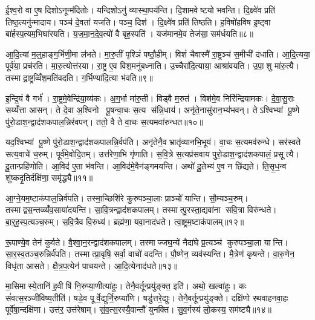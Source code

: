 ई॒श्व॒रो वा ए॒ष दिशोऽनून्म॑दितोः। यन्दिशोऽनु॑ व्यास्था॒पय॑न्ति। दि॒शामवेष्टयो भवन्ति। दि॒क्ष्वे॑व प्रति॑ तिष्ठ॒त्यनु॑न्मादाय। पञ्च॑ दे॒वता॑ यजति। पञ्च॒ दिश॑। दि॒क्ष्वे॑व प्रति॑ तिष्ठति। ह॒विषो॑हविष इ॒ष्ट्वा बा॑र्\mbox{}हस्प॒त्यम॒भिघा॑रयति। य॒ज॒मा॒न॒दे॒व॒त्यो॑ वै बृह॒स्पति॑। यज॑मानमे॒व तेज॑सा॒ सम॑र्धयति॥८॥

आ॒दि॒त्यां म॒ल्॒हाङ्ग॒र्भिणी॒मा ल॑भते। मा॒रु॒तीं पृश्ञिं॑ पष्ठौ॒हीम्। विशं॑ चैवास्मै॑ रा॒ष्ट्रञ्च॑ स॒मीची॑ दधाति। आ॒दि॒त्यया॒ पूर्व॑या॒ प्रच॑रति। मा॒रु॒त्योत्त॑रया। रा॒ष्ट्र ए॒व विश॒मनु॑बध्नाति। उ॒च्चैरा॑दि॒त्याया॒ आश्रा॑वयति। उ॒पा॒शु मा॑रु॒त्यै। तस्माद्रा॒ष्ट्रव्विँश॒मति॑वदति। ग॒र्भिण्या॑दि॒त्या भ॑वति॥९॥

इ॒न्द्रि॒यं वै गर्भ॑। रा॒ष्ट्रमे॒वेन्द्रि॑या॒व्य॑कः। अ॒ग॒र्भा मा॑रु॒ती। विड्वै म॒रुत॑। विश॑मे॒व निरि॑न्द्रियामकः। दे॒वा॒सु॒राः सय्यँ॑त्ता आसन्। ते दे॒वा अ॒श्विनो पू॒षन्वा॒चः स॒त्य स॑न्नि॒धाय॑। अनृ॑ते॒नासु॑रान॒भ्य॑भवन्। तेऽश्विभ्यां पू॒ष्णे पु॑रो॒डाश॒न्द्वाद॑शकपाल॒न्निर॑वपन्। ततो॒ वै ते वा॒चः स॒त्यमवा॑रुन्धत॥१०॥

यद॒श्विभ्यां पू॒ष्णे पु॑रो॒डाश॒न्द्वाद॑शकपालन्नि॒र्वप॑ति। अनृ॑तेनै॒व भ्रातृ॑व्यानभि॒भूय॑। वा॒चः स॒त्यमव॑रुन्धे। सर॑स्वते सत्य॒वाचे॑ च॒रुम्। पूर्व॑मे॒वोदि॒तम्। उत्त॑रेणा॒भि गृ॑णाति। स॒वि॒त्रे स॒त्यप्र॑सवाय पुरो॒डाश॒न्द्वाद॑शकपालं॒ प्रसूत्यै। दू॒तान्प्रहि॑णोति। आ॒विद॑ ए॒ता भ॑वन्ति। आ॒विद॑मे॒वैन॑ङ्गमयन्ति। अथो॑ दू॒तेभ्य॑ ए॒व न छि॑द्यते। ति॒सृ॒ध॒न्व शु॑ष्कदृ॒तिर्दक्षि॑णा॒ समृ॑द्ध्यै॥११॥\anuvakamend[अ॒र्ध॒य॒ति॒ भ॒व॒त्य॒रु॒न्ध॒त॒ ग॒म॒य॒न्ति॒ द्वे च॑]

आ॒ग्ने॒यम॒ष्टाक॑पाल॒न्निर्व॑पति। तस्मा॒च्छिशि॑रे कुरुपञ्चा॒लाः प्राञ्चो॑ यान्ति। सौ॒म्यञ्च॒रुम्। तस्माद्वस॒न्तव्व्यँ॑व॒साया॑दयन्ति। सा॒वि॒त्रन्द्वाद॑शकपालम्। तस्मात्पु॒रस्ता॒द्यवा॑ना सवि॒त्रा विरु॑न्धते। बा॒र्॒ह॒स्प॒त्यञ्च॒रुम्। स॒वि॒त्रैव वि॒रुध्य॑। ब्रह्म॑णा॒ यवा॒नाद॑धते। त्वा॒ष्ट्रम॒ष्टाक॑पालम्॥१२॥

रू॒पाण्ये॒व तेन॑ कुर्वते। वै॒श्वा॒न॒रन्द्वाद॑शकपालम्। तस्माज्जघ॒न्ये॑ नैदा॑घे प्र॒त्यञ्च॑ कुरुपञ्चा॒ला यान्ति। सा॒र॒स्व॒तञ्च॒रुन्निर्व॑पति। तस्मात्प्रा॒वृषि॒ सर्वा॒ वाचो॑ वदन्ति। पौ॒ष्णेन॒ व्यव॑स्यन्ति। मै॒त्रेण॑ कृषन्ते। वा॒रु॒णेन॒ विधृ॑ता आसते। क्षै॒त्र॒प॒त्येन॑ पाचयन्ते। आ॒दि॒त्येनाद॑धते॥१३॥

मा॒सिमास्ये॒तानि॑ ह॒वीषि॑ नि॒रुप्या॒णीत्या॑हुः। तेनै॒वर्तून्प्रयु॑ङ्क्त॒ इति॑। अथो॒ खल्वा॑हुः। कः सं॑वत्स॒रञ्जी॑विष्य॒तीति॑। षडे॒व पूर्वे॒द्युर्नि॒रुप्या॑णि। षडु॑त्तरे॒द्युः। तेनै॒वर्तून्प्रयु॑ङ्क्ते। दक्षि॑णो रथवाहनवा॒हः पूर्वे॑षा॒न्दक्षि॑णा। उत्त॑र॒ उत्त॑रेषाम्। सं॒व॒त्स॒रस्यै॒वान्तौ॑ युनक्ति। सु॒व॒र्गस्य॑ लो॒कस्य॒ सम॑ष्ट्यै॥१४॥\anuvakamend[त्वा॒ष्ट्रम॒ष्टाक॑पालन्दधते युन॒क्त्येकं॑ च]

